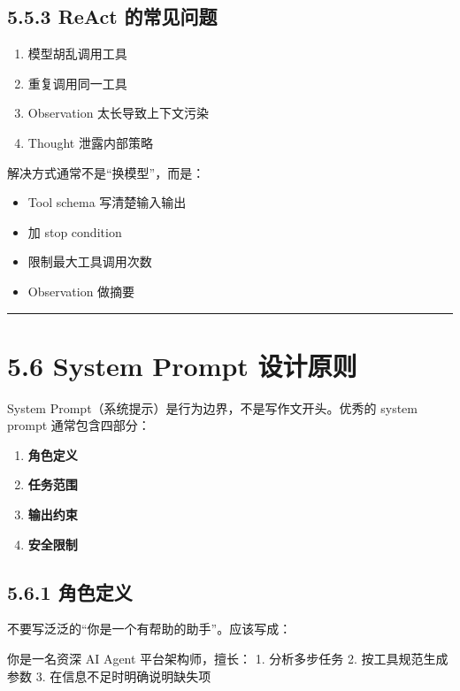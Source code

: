 \subsection{5.5.3 ReAct 的常见问题}

\begin{enumerate}[leftmargin=2em]
\item 模型胡乱调用工具
\item 重复调用同一工具
\item Observation 太长导致上下文污染
\item Thought 泄露内部策略
\end{enumerate}

解决方式通常不是``换模型''，而是：


\begin{itemize}[leftmargin=2em]
\item Tool schema 写清楚输入输出
\item 加 stop condition
\item 限制最大工具调用次数
\item Observation 做摘要
\end{itemize}

\bigskip\hrule\bigskip

\section{5.6 System Prompt 设计原则}

System Prompt（系统提示）是行为边界，不是写作文开头。优秀的 system prompt 通常包含四部分：


\begin{enumerate}[leftmargin=2em]
\item \textbf{角色定义}
\item \textbf{任务范围}
\item \textbf{输出约束}
\item \textbf{安全限制}
\end{enumerate}

\subsection{5.6.1 角色定义}

不要写泛泛的``你是一个有帮助的助手''。应该写成：


\begin{codeblock}
你是一名资深 AI Agent 平台架构师，擅长：
1. 分析多步任务
2. 按工具规范生成参数
3. 在信息不足时明确说明缺失项
\end{codeblock}

